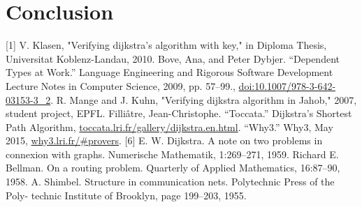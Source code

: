 \documentclass[11pt, a4paper]{article} %
\theoremstyle{definition}
\begin{document}

\section{Conclusion}

\newpage %

%

[1] V. Klasen, "Verifying dijkstra's algorithm with key," in Diploma Thesis, Universitat Koblenz-Landau, 2010.%
\newline
[2] Bove, Ana, and Peter Dybjer. “Dependent Types at Work.” Language Engineering and Rigorous Software Development Lecture Notes in Computer Science, 2009, pp. 57–99., \url{doi:10.1007/978-3-642-03153-3_2}. %
\newline
[3] R. Mange and J. Kuhn, "Verifying dijkstra algorithm in Jahob," 2007, student project, EPFL.%
\newline
[4] Filliâtre, Jean-Christophe. “Toccata.” Dijkstra's Shortest Path Algorithm, \url{toccata.lri.fr/gallery/dijkstra.en.html}.%
\newline
[5] “Why3.” Why3, May 2015, \url{why3.lri.fr/#provers}. %
\newline
[6] E. W. Dijkstra. A note on two problems in connexion with graphs. Numerische Mathematik, 1:269–271, 1959.
\newline 
[7] Richard E. Bellman. On a routing problem. Quarterly of Applied Mathematics, 16:87–90, 1958.
\newline
[8] A. Shimbel. Structure in communication nets. Polytechnic Press of the Poly- technic Institute of Brooklyn, page 199–203, 1955.
\end{document}
